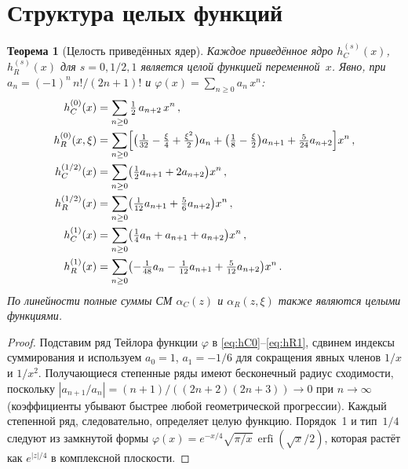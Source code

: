 \documentclass[aps,prd,twocolumn,superscriptaddress,nofootinbib,floatfix]{revtex4-2}
\newtheorem{theorem}{\cyrillicfont Теорема}[section]
\theoremstyle{definition}
\theoremstyle{remark}
\newcommand{\erfi}{\operatorname{erfi}}
\begin{document}
\section{Структура целых функций}
\label{sec:entire}

\begin{theorem}[Целость приведённых ядер]
\label{thm:entire}
Каждое приведённое ядро $h_C^{(s)}(x)$, $h_R^{(s)}(x)$ для $s = 0, 1/2, 1$
является целой функцией переменной~$x$. Явно, при
$a_n = (-1)^n\,n!/(2n+1)!$ и
$\varphi(x) = \sum_{n \geq 0} a_n\,x^n$:
\begin{subequations}
\label{eq:entire-series}
\begin{align}
  h_C^{(0)}(x) &= \sum_{n \geq 0}\tfrac{1}{2}\,a_{n+2}\,x^n\,,\\
  h_R^{(0)}(x,\xi) &= \sum_{n \geq 0}\Bigl[
    \bigl(\tfrac{1}{32} - \tfrac{\xi}{4} + \tfrac{\xi^2}{2}\bigr)a_n
    + \bigl(\tfrac{1}{8} - \tfrac{\xi}{2}\bigr)a_{n+1}
    + \tfrac{5}{24}a_{n+2}\Bigr]x^n\,,\\
  h_C^{(1/2)}(x) &= \sum_{n \geq 0}\bigl(
    \tfrac{1}{2}a_{n+1} + 2a_{n+2}\bigr)x^n\,,\\
  h_R^{(1/2)}(x) &= \sum_{n \geq 0}\bigl(
    \tfrac{1}{12}a_{n+1} + \tfrac{5}{6}a_{n+2}\bigr)x^n\,,\\
  h_C^{(1)}(x) &= \sum_{n \geq 0}\bigl(
    \tfrac{1}{4}a_n + a_{n+1} + a_{n+2}\bigr)x^n\,,\\
  h_R^{(1)}(x) &= \sum_{n \geq 0}\bigl(
    -\tfrac{1}{48}a_n - \tfrac{1}{12}a_{n+1}
    + \tfrac{5}{12}a_{n+2}\bigr)x^n\,.
\end{align}
\end{subequations}
По линейности полные суммы СМ $\alpha_C(z)$ и $\alpha_R(z,\xi)$ также
являются целыми функциями.
\end{theorem}

\begin{proof}
Подставим ряд Тейлора функции $\varphi$ в
\eqref{eq:hC0}--\eqref{eq:hR1}, сдвинем индексы суммирования и используем
$a_0 = 1$, $a_1 = -1/6$ для сокращения явных членов $1/x$ и $1/x^2$.
Получающиеся степенные ряды имеют бесконечный радиус сходимости, поскольку
$|a_{n+1}/a_n| = (n+1)/((2n+2)(2n+3)) \to 0$ при $n \to \infty$
(коэффициенты убывают быстрее любой геометрической прогрессии). Каждый
степенной ряд, следовательно, определяет целую функцию. Порядок~1 и
тип~$1/4$ следуют из замкнутой формы
$\varphi(x) = e^{-x/4}\sqrt{\pi/x}\,\erfi(\sqrt{x}/2)$, которая растёт
как $e^{|z|/4}$ в комплексной плоскости.
\end{proof}
\end{document}
